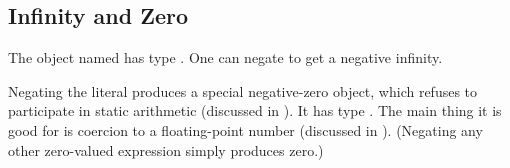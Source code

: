 \subsection{Infinity and Zero}

The object named \EXP{\infty} has type .
One can negate \EXP{\infty} to get a negative infinity.

Negating the literal  produces a special negative-zero object,
which refuses to participate in static arithmetic
(discussed in ).  It
has type .  The main thing it is good for is coercion to
a floating-point number (discussed in
).
(Negating any other zero-valued expression simply produces zero.)
